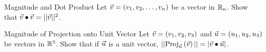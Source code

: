 \begin{exercise}{Magnitude and Dot Product}
Let $\vec{v}=(v_1,v_2,\ldots,v_n)$ be a vector in $\mathbb{R}_n$. Show that $\vec{v}\bullet\vec{v}=||\vec{v}||^2$.
\end{exercise}

\begin{exercise}{\hypertarget{unitproj}{Magnitude of Projection onto Unit Vector}}
Let $\vec{v}=(v_1,v_2,v_3)$ and $\vec{u}=(u_1,u_2,u_3)$ be vectors in $\mathbb{R}^3$. Show that if $\vec{u}$ is a unit vector, $||\mathrm{Proj}_{\vec{u}}\left({\vec{v}}\right)||=|\vec{v}\bullet\vec{u}|$.
\end{exercise}
\renewcommand\thesubsection{\thesection.\arabic{subsection}}